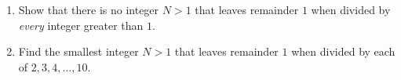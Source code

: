 \begin{enumerate}
\item[(a)] Show that there is no integer $N>1$ that leaves remainder $1$ when divided by \emph{every} integer greater than $1$.
\item[(b)] Find the smallest integer $N>1$ that leaves remainder $1$ when divided by each of $2,3,4,\dots,10$.
\end{enumerate}
